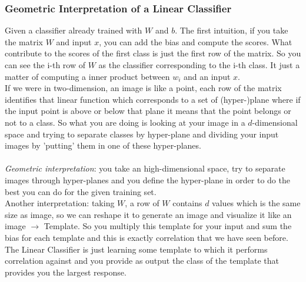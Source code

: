\subsubsection{Geometric Interpretation of a Linear Classifier}
Given a classifier already trained with $W$ and $b$. The first intuition, if you take the matrix $W$ and input $x$, you can add the bias and compute the scores. What contribute to the scores of the first class is just the first row of the matrix. So you can see the i-th row of $W$ as the classifier corresponding to the i-th class. It just a matter of computing a inner product between $w_i$ and an input $x$.\\
If we were in two-dimension, an image is like a point, each row of the matrix identifies that linear function which corresponds to a set of (hyper-)plane where if the input point is above or below that plane it means that the point belongs or not to a class. So what you are doing is looking at your image in a $d$-dimensional space and trying to separate classes by hyper-plane and dividing your input images by 'putting' them in one of these hyper-planes. \\ \\
\textit{Geometric interpretation}: you take an high-dimensional space, try to separate images through hyper-planes and you define the hyper-plane in order to do the best you can do for the given training set. \\

Another interpretation: taking $W$, a row of $W$ contains $d$ values which is the same size as image, so we can reshape it to generate an image and visualize it like an image $\rightarrow$  Template. So you multiply this template for your input and sum the bias for each template and this is exactly correlation that we have seen before. The Linear Classifier is just learning some template to which it performs correlation against and you provide as output the class of the template that provides you the largest response. 